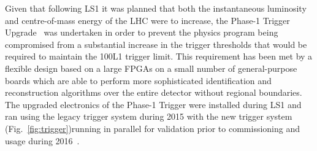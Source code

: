 Given that following LS1 it was planned that both the instantaneous luminosity and centre-of-mass energy of the LHC were to increase, the Phase-1 Trigger Upgrade~\cite{Tapper:2013yva} was undertaken in order to prevent the physics program being compromised from a substantial increase in the trigger thresholds that would be required to maintain the 100\kHz L1 trigger limit.	
This requirement has been met by a flexible design based on a large FPGAs on a small number of general-purpose boards which are able to perform more sophisticated identification and reconstruction algorithms over the entire detector without regional boundaries.
The upgraded electronics of the Phase-1 Trigger were installed during LS1 and ran using the legacy trigger system during 2015 with the new trigger system (Fig.~\ref{fig:trigger})running in parallel for validation prior to commissioning and usage during 2016~\cite{Zabi:2017lya}.


